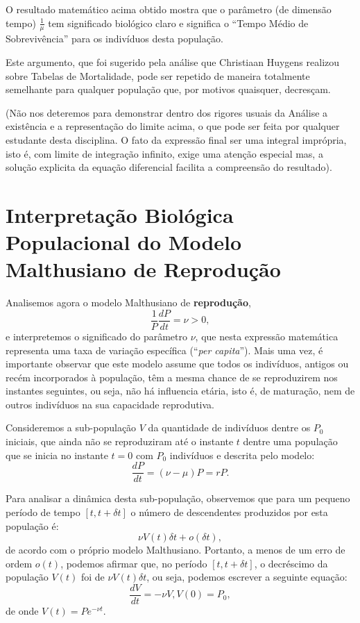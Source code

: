     O resultado matemático acima obtido mostra que o parâmetro (de dimensão tempo) \(\frac{1}{\mu}\) tem significado biológico claro e significa o ``Tempo Médio de Sobrevivência'' para os indivíduos desta população.

    Este argumento, que foi sugerido pela análise que Christiaan Huygens realizou sobre Tabelas de Mortalidade, pode ser repetido de maneira totalmente semelhante para qualquer população que, por motivos quaisquer, decresçam.

    (Não nos deteremos para demonstrar dentro dos rigores usuais da Análise a existência e a representação do limite acima, o que pode ser feita por qualquer estudante desta disciplina. O fato da expressão final ser uma integral imprópria, isto é, com limite de integração infinito, exige uma atenção especial mas, a solução explicita da equação diferencial facilita a compreensão do resultado).

\section{Interpretação Biológica Populacional do Modelo Malthusiano de Reprodução}

    Analisemos agora o modelo Malthusiano de \textbf{reprodução},
    \[\dfrac{1}{P} \dfrac{dP}{dt} = \nu > 0,\]
    e interpretemos o significado do parâmetro \(\nu\), que nesta expressão matemática representa uma taxa de variação específica (``\textit{per capita}''). Mais uma vez, é importante observar que este modelo assume que todos os indivíduos, antigos ou recém incorporados à população, têm a mesma chance de se reproduzirem nos instantes seguintes, ou seja, não há influencia etária, isto é, de maturação, nem de outros indivíduos na sua capacidade reprodutiva.

    Consideremos a sub-população \(V\) da quantidade de indivíduos dentre os \(P_0\) iniciais, que ainda não se reproduziram até o instante \(t\) dentre uma população que se inicia no instante \(t=0\) com \(P_0\) indivíduos e descrita pelo modelo:
    \[\dfrac{dP}{dt} = (\nu-\mu) P = rP.\]


    Para analisar a dinâmica desta sub-população, observemos que para um pequeno período de tempo \([t, t+\delta t]\) o número de descendentes produzidos por esta população é:
    \[\nu V(t) \delta t + o(\delta t),\]
    de acordo com o próprio modelo Malthusiano. Portanto, a menos de um erro de ordem \(o(t)\), podemos afirmar que, no período \([t, t+\delta t]\), o decréscimo da população \(V(t)\) foi de \(\nu V(t) \delta t\), ou seja, podemos escrever a seguinte equação:
    \[\dfrac{dV}{dt} = -\nu V, V(0) = P_0,\]
    de onde \(V(t) = P e^{-\nu t}\).

